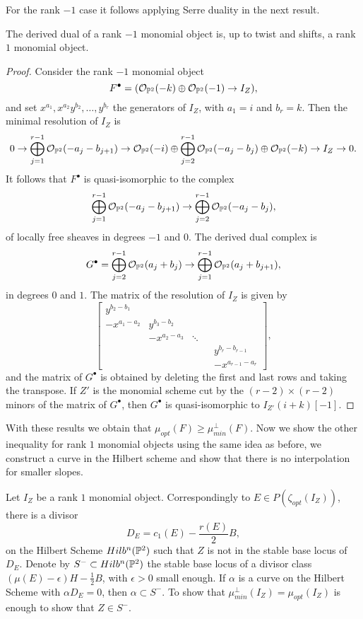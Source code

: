 \documentclass[
	oldfontcommands,
	sumario=abnt-6027-2012,
	12pt,			%
	openright,		%
	oneside,		%
	a4paper,		%
	english,		%
	brazil			%
	]{imecc-unicamp}
\begin{document}
For the rank $-1$ case it follows applying Serre duality in the next result.

\begin{proposition}
	The derived dual of a rank $-1$ monomial object is, up to twist and shifts, a rank $1$ monomial object.
\end{proposition}
\begin{proof}
	Consider the rank $-1$ monomial object $$
	F^\bullet = ({\mathcal O}_{{\mathbb P}^2}(-k)\oplus {\mathcal O}_{{\mathbb P}^2}(-1)\rightarrow I_Z ),
	$$
	and set $x^{a_1},x^{a_2}y^{b_2},\dots, y^{b_r}$ the generators of $I_Z$, with $a_1=i$ and $b_r=k$. Then the minimal resolution of $I_Z$ is $$
	0\rightarrow \bigoplus_{j=1}^{r-1}{\mathcal O}_{{\mathbb P}^2}(-a_j-b_{j+1})\rightarrow {\mathcal O}_{{\mathbb P}^2}(-i)\oplus\bigoplus_{j=2}^{r-1}{\mathcal O}_{{\mathbb P}^2}(-a_j-b_j)\oplus{\mathcal O}_{{\mathbb P}^2}(-k)\rightarrow I_Z\rightarrow 0.
	$$
	It follows that $F^\bullet$ is quasi-isomorphic to the complex $$\bigoplus_{j=1}^{r-1}{\mathcal O}_{{\mathbb P}^2}(-a_j-b_{j+1})\rightarrow \bigoplus_{j=2}^{r-1}{\mathcal O}_{{\mathbb P}^2}(-a_j-b_j),$$ of locally free sheaves in degrees $-1$ and $0$. The derived dual complex is $$
	G^\bullet = \bigoplus_{j=2}^{r-1}{\mathcal O}_{{\mathbb P}^2}(a_j+b_{j})\rightarrow \bigoplus_{j=1}^{r-1}{\mathcal O}_{{\mathbb P}^2}(a_j+b_{j+1}),
	$$
	in degrees $0$ and $1$. The matrix of the resolution of $I_Z$ is given by $$
	\begin{bmatrix}
	y^{b_2-b_1}&&&\\
	-x^{a_1-a_2}&y^{b_3-b_2}&&\\
	&-x^{a_2-a_3}&\ddots&\\
	&&&&y^{b_r-b_{r-1}}\\
	&&&&-x^{a_{r-1}-a_r}
	\end{bmatrix},
	$$
	and the matrix of $G^\bullet$ is obtained by deleting the first and last rows and taking the transpose. If $Z'$ is the monomial scheme cut by the $(r-2)\times (r-2)$ minors of the matrix of $G^\bullet$, then $G^\bullet$ is quasi-isomorphic to $I_{Z'}(i+k)[-1]$.  	
\end{proof}

With these results we obtain that $\mu_{opt}(F)\geq\mu_{min}^\perp(F)$. Now we show the other inequality for rank $1$ monomial objects using the same idea as before, we construct a curve in the Hilbert scheme and show that there is no interpolation for smaller slopes.

Let $I_Z$ be a rank $1$ monomial object. Correspondingly to $E\in P(\zeta_{opt}(I_Z))$, there is a divisor $$
D_E=c_1(E)-\frac{r(E)}{2}B,
$$
on the Hilbert Scheme $Hilb^n({\mathbb P}^2)$ such that $Z$ is not in the stable base locus of $D_E$. Denote by $S^-\subset Hilb^n({\mathbb P}^2)$ the stable base locus of a divisor class $(\mu(E)-\epsilon)H-\frac{1}{2}B$, with $\epsilon>0$ small enough. If $\alpha$ is a curve on the Hilbert Scheme with $\alpha D_E=0$, then $\alpha\subset S^-$. To show that $\mu_{min}^\perp(I_Z)=\mu_{opt}(I_Z)$ is enough to show that $Z\in S^-$. 
\end{document}
